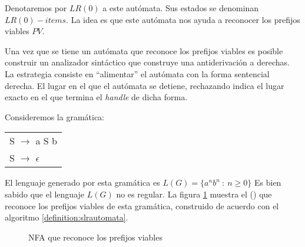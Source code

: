 Denotaremos por $LR(0)$ a este autómata. Sus estados se denominan $LR(0)-items$. La idea es que este
autómata nos ayuda a reconocer los prefijos viables $PV$.

Una vez que se tiene un autómata que reconoce los prefijos viables es posible construir un analizador sintáctico que construye una antiderivación a derechas. La estrategia consiste en ``alimentar'' el autómata con la forma sentencial derecha. El lugar en el que el autómata se detiene, rechazando indica el lugar exacto en el que termina el \emph{handle} de dicha forma.


\begin{example}
\label{example:asb}
Consideremos la gramática:

\vspace{0.5cm}
\begin{center}
\begin{tabular}{l}
S      $\rightarrow$  a S b\\
S      $\rightarrow$ $\epsilon$ 
\end{tabular}
\end{center}
\vspace{0.25cm}

El lenguaje generado por esta gramática es $L(G) = \{ a^n b^n\ :\ n \ge 0 \}$
Es bien sabido que el lenguaje $L(G)$ no es regular.
La figura \ref{fig:nfa} muestra 
el  
()
que reconoce los prefijos viables de esta gramática, construido
de acuerdo con el algoritmo \ref{definition:slrautomata}.

\begin{center}
\begin{figure}[htb]
\centerline{}
\caption{NFA que reconoce los prefijos viables}
\label{fig:nfa}
\end{figure}
\end{center}
\end{example}

